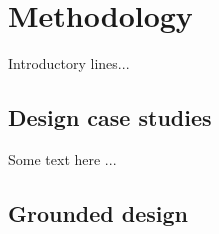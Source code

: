 \chapter{Methodology} 

Introductory lines...

\section{Design case studies}

Some text here ...

\section{Grounded design}
